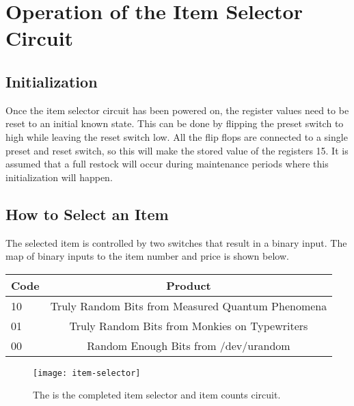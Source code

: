 \section{Operation of the Item Selector Circuit}

\subsection{Initialization}
Once the item selector circuit has been powered on, the register values need to be reset to an initial known state. This can be done by flipping the preset switch to high while leaving the reset switch low. All the flip flops are connected to a single preset and reset switch, so this will make the stored value of the registers 15. It is assumed that a full restock will occur during maintenance periods where this initialization will happen.

\subsection{How to Select an Item}
The selected item is controlled by two switches that result in a binary input. The map of binary inputs to the item number and price is shown below.

\vspace{1em}

\begin{tabular}{|l|c|}
\hline
\textbf{Code} & \textbf{Product} \\
\hline
10 & Truly Random Bits from Measured Quantum Phenomena \\
\hline
01 & Truly Random Bits from Monkies on Typewriters \\
\hline
00 & Random Enough Bits from /dev/urandom \\
\hline
\end{tabular}


\begin{figure}[H]
\centering
\texttt{[image: item-selector]} \\
\caption{The is the completed item selector and item counts circuit.}
\label{item-selector}
\end{figure}
